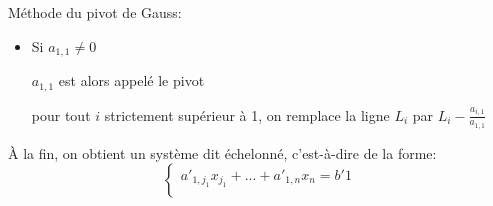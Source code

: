 \documentclass[../main.tex]{subfile}
\begin{document}

%		


Méthode du pivot de Gauss:\\
\begin{itemize}
	\item Si $a_{1,1} \neq 0$\\
	\begin{nota}
		$a_{1,1}$ est alors appelé le pivot
	\end{nota}
	pour tout $i$ strictement supérieur à 1, on remplace la ligne $L_i$ par $L_i - \frac{a_{i,1}}{a_{1,1}}$
\end{itemize}

\`A la fin, on obtient un système dit échelonné, c'est-à-dire de la forme:\\
	$$
	\left\{
	\begin{array}{r}
		a'_{1, j_1}x_{j_1} + ... + a'_{1, n}x_n = b'1\\

	\end{array}
	\right.
	$$
\end{document}
